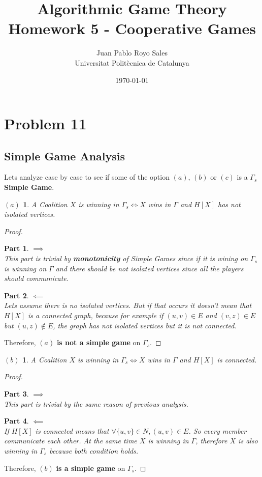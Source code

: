 \documentclass[12pt, a4paper]{article}
\title{%
  Algorithmic Game Theory \\
  Homework 5 - Cooperative Games
}
\author{%
  Juan Pablo Royo Sales\\
  \small{Universitat Politècnica de Catalunya}
}
\date\today
\begin{document}
\maketitle

\section{Problem 11}

\subsection{Simple Game Analysis}
Lets analyze case by case to see if some of the option $(a)$, $(b)$ or $(c)$ is a $\Gamma_s$ \textbf{Simple Game}.

\newtheorem{case_a}{$(a)$}
\newtheorem{proofpart}{Part}
\begin{case_a}
  A Coalition $X$ is winning in $\Gamma_s \iff X$ wins in $\Gamma$ and $H[X]$ has not isolated vertices.
\end{case_a}

\begin{proof}
\begin{proofpart}
$\implies$\\
This part is trivial by \textbf{monotonicity} of Simple Games since if it is wining on $\Gamma_s$ is winning on $\Gamma$ and
there should be not isolated vertices since all the players should communicate.
\end{proofpart}

\begin{proofpart}
$\impliedby$\\
Lets assume there is no isolated vertices. But if that occurs it doesn't mean that $H[X]$ is a connected graph, because
for example if $(u,v) \in E$ and $(v,z) \in E$ but $(u,z) \notin E$, the graph has not isolated vertices but it is not connected.
\end{proofpart}

Therefore, $(a)$ \textbf{is not a simple game} on $\Gamma_s$.
\end{proof}

\newtheorem{case_b}{$(b)$}
\newtheorem{proofpart_b}{Part}
\begin{case_b}
  A Coalition $X$ is winning in $\Gamma_s \iff X$ wins in $\Gamma$ and $H[X]$ is connected.
\end{case_b}

\begin{proof}
\begin{proofpart}
$\implies$\\
This part is trivial by the same reason of previous analysis.
\end{proofpart}

\begin{proofpart}
$\impliedby$\\
If $H[X]$ is connected means that $\forall \{u,v\} \in N, (u,v) \in E$. So every member communicate each other.
At the same time $X$ is winning in $\Gamma$, therefore $X$ is also winning in $\Gamma_s$ because both condition holds.
\end{proofpart}

Therefore, $(b)$ \textbf{is a simple game} on $\Gamma_s$.
\end{proof}
\end{document}
